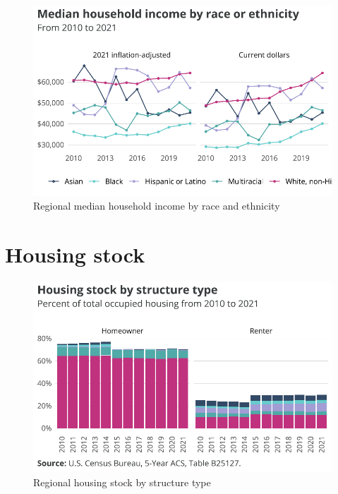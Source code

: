 \documentclass[
  letterpaper,
  DIV=11,
  numbers=noendperiod]{scrreprt}
\begin{document}
\begin{figure}[H]

{\centering \includegraphics{./part-3-1_files/figure-pdf/fig-inc-race-msa-1.pdf}

}

\caption{\label{fig-inc-race-msa}Regional median household income by
race and ethnicity}

\end{figure}

\hypertarget{housing-stock}{%
\section{Housing stock}\label{housing-stock}}

\begin{figure}[H]

{\centering \includegraphics{./part-3-1_files/figure-pdf/fig-structure-1.pdf}

}

\caption{\label{fig-structure}Regional housing stock by structure type}

\end{figure}
\end{document}
